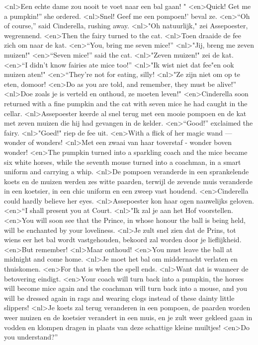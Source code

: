 <nl>Een echte dame zou nooit te voet naar een bal gaan! "
<en>Quick! Get me a pumpkin!” she ordered.
<nl>Snel! Geef me een pompoen!' beval ze.
<en>“Oh of course,” said Cinderella, rushing away.
<nl>"Oh natuurlijk," zei Assepoester, wegrennend.
<en>Then the fairy turned to the cat.
<nl>Toen draaide de fee zich om naar de kat.
<en>“You, bring me seven mice!”
<nl>"Jij, breng me zeven muizen!"
<en>“Seven mice!” said the cat.
<nl>"Zeven muizen!" zei de kat.
<en>“I didn’t know fairies ate mice too!”
<nl>"Ik wist niet dat fee"en ook muizen aten!"
<en>“They’re not for eating, silly!
<nl>"Ze zijn niet om  op te eten, domoor!
<en>Do as you are told, and remember, they must be alive!”
<nl>Doe zoals je is verteld en onthoud, ze moeten leven!"
<en>Cinderella soon returned with a fine pumpkin and the cat with seven mice he had caught in the cellar.
<nl>Assepoester keerde al snel terug met een mooie pompoen en de kat met zeven muizen die hij had gevangen  in de kelder.
<en>“Good!” exclaimed the fairy.
<nl>"Goed!" riep de fee uit.
<en>With a flick of her magic wand — wonder of wonders!
<nl>Met een zwaai van haar toverstaf - wonder boven wonder!
<en>The pumpkin turned into a sparkling coach and the mice became six white horses, while the seventh mouse turned into a coachman, in a smart uniform and carrying a whip.
<nl>De pompoen veranderde in een sprankelende koets en de muizen werden zes witte paarden, terwijl de zevende muis veranderde in een koetsier, in een chic uniform en  een zweep vast houdend.
<en>Cinderella could hardly believe her eyes.
<nl>Assepoester kon haar ogen nauwelijks geloven.
<en>“I shall present you at Court.
<nl>"Ik zal je aan het Hof voorstellen.
<en>You will soon see that the Prince, in whose honour the ball is being held, will be enchanted by your loveliness.
<nl>Je zult snel zien dat de Prins, tot wiens eer het bal wordt vastgehouden, bekoord zal worden door je lieflijkheid.
<en>But remember!
<nl>Maar onthoud!
<en>You must leave the ball at midnight and come home.
<nl>Je moet het bal om middernacht verlaten en thuiskomen.
<en>For that is when the spell ends.
<nl>Want dat is wanneer de betovering eindigt.
<en>Your coach will turn back into a pumpkin, the horses will become mice again and the coachman will turn back into a mouse, and you will be dressed again in rags and wearing clogs instead of these dainty little slippers!
<nl>Je koets zal terug veranderen in een pompoen, de paarden worden weer muizen en de koetsier verandert in een muis, en je zult weer gekleed gaan in vodden en klompen dragen in plaats van deze schattige kleine muiltjes!
<en>Do you understand?”

